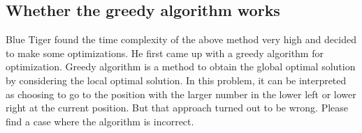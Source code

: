 \documentclass[11pt]{exam}
\begin{document}
\subsection{Whether the greedy algorithm works}
Blue Tiger found the time complexity of the above method very high and decided to make some optimizations. 
He first came up with a greedy algorithm for optimization. 
Greedy algorithm is a method to obtain the global optimal solution by considering the local optimal solution. 
In this problem, it can be interpreted as choosing to go to the position with the larger number in the lower left or lower right at the current position.
But that approach turned out to be wrong. Please find a case where the algorithm is incorrect.
\begin{solution}
    \\ \hspace*{\fill} \\
    \\ \hspace*{\fill} \\
    \\ \hspace*{\fill} \\
    \\ \hspace*{\fill} \\
    \\ \hspace*{\fill} \\
    \\ \hspace*{\fill} \\
    \\ \hspace*{\fill} \\
    \\ \hspace*{\fill} \\
    
\end{solution}
\end{document}
